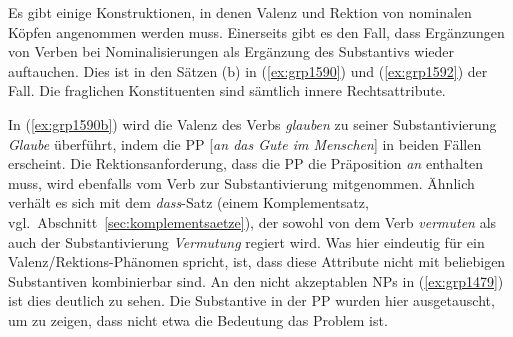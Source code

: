 \label{sec:rektioninderngr}


Es gibt einige Konstruktionen, in denen Valenz und Rektion von nominalen Köpfen angenommen werden muss.
Einerseits gibt es den Fall, dass Ergänzungen von Verben bei Nominalisierungen als Ergänzung des Substantivs wieder auftauchen.
Dies ist in den Sätzen (b) in (\ref{ex:grp1590}) und (\ref{ex:grp1592}) der Fall.
Die fraglichen Konstituenten sind sämtlich innere Rechtsattribute.

\begin{exe}
  \ex\label{ex:grp1590}
  \begin{xlist}
  \end{xlist}
  \ex\label{ex:grp1592}
  \begin{xlist}
  \end{xlist}
\end{exe}

In (\ref{ex:grp1590b}) wird die Valenz des Verbs \textit{glauben} zu seiner Substantivierung \textit{Glaube} überführt, indem die PP [\textit{an das Gute im Menschen}] in beiden Fällen erscheint.
Die Rektionsanforderung, dass die PP die Präposition \textit{an} enthalten muss, wird ebenfalls vom Verb zur Substantivierung mitgenommen.
Ähnlich verhält es sich mit dem \textit{dass}-Satz (einem Komplementsatz, vgl.\ Abschnitt~\ref{sec:komplementsaetze}), der sowohl von dem Verb \textit{vermuten} als auch der Substantivierung \textit{Vermutung} regiert wird.
Was hier eindeutig für ein Valenz\slash Rektions-Phänomen spricht, ist, dass diese Attribute nicht mit beliebigen Substantiven kombinierbar sind.
An den nicht akzeptablen NPs in (\ref{ex:grp1479}) ist dies deutlich zu sehen.
Die Substantive in der PP wurden hier ausgetauscht, um zu zeigen, dass nicht etwa die Bedeutung das Problem ist.

\begin{exe}
  \ex\label{ex:grp1479}
  \begin{xlist}
  \end{xlist}
\end{exe}


